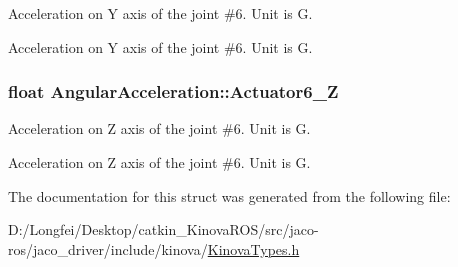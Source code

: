 Acceleration on Y axis of the joint \#6. Unit is G. 

Acceleration on Y axis of the joint \#6. Unit is G. 
\subsubsection[{\texorpdfstring{Actuator6\+\_\+Z}{Actuator6_Z}}]{\setlength{\rightskip}{0pt plus 5cm}float Angular\+Acceleration\+::\+Actuator6\+\_\+Z}\hypertarget{structAngularAcceleration_a22ce9847bc5c4aee829b734081e944fd}{}\label{structAngularAcceleration_a22ce9847bc5c4aee829b734081e944fd}


Acceleration on Z axis of the joint \#6. Unit is G. 

Acceleration on Z axis of the joint \#6. Unit is G. 

The documentation for this struct was generated from the following file\+:\begin{DoxyCompactItemize}
\item 
D\+:/\+Longfei/\+Desktop/catkin\+\_\+\+Kinova\+R\+O\+S/src/jaco-\/ros/jaco\+\_\+driver/include/kinova/\hyperlink{KinovaTypes_8h}{Kinova\+Types.\+h}\end{DoxyCompactItemize}
